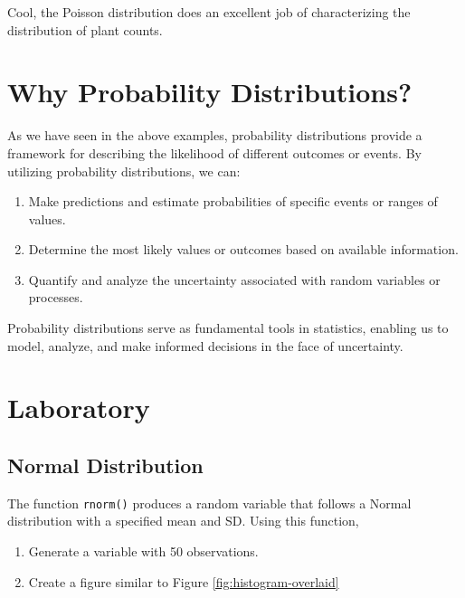 \documentclass[
]{book}
\providecommand{\tightlist}{%
  \setlength{\itemsep}{0pt}\setlength{\parskip}{0pt}}
\begin{document}
Cool, the Poisson distribution does an excellent job of characterizing the distribution of plant counts.

\hypertarget{why-probability-distributions}{%
\section{Why Probability Distributions?}\label{why-probability-distributions}}

As we have seen in the above examples, probability distributions provide a framework for describing the likelihood of different outcomes or events. By utilizing probability distributions, we can:

\begin{enumerate}
\def\labelenumi{\arabic{enumi}.}
\tightlist
\item
  Make predictions and estimate probabilities of specific events or ranges of values.
\item
  Determine the most likely values or outcomes based on available information.
\item
  Quantify and analyze the uncertainty associated with random variables or processes.
\end{enumerate}

Probability distributions serve as fundamental tools in statistics, enabling us to model, analyze, and make informed decisions in the face of uncertainty.

\hypertarget{laboratory-2}{%
\section{Laboratory}\label{laboratory-2}}

\hypertarget{normal-distribution}{%
\subsection{Normal Distribution}\label{normal-distribution}}

The function \texttt{rnorm()} produces a random variable that follows a Normal distribution with a specified mean and SD. Using this function,

\begin{enumerate}
\def\labelenumi{\arabic{enumi}.}
\tightlist
\item
  Generate a variable with 50 observations.
\item
  Create a figure similar to Figure \ref{fig:histogram-overlaid}
\end{enumerate}
\end{document}
